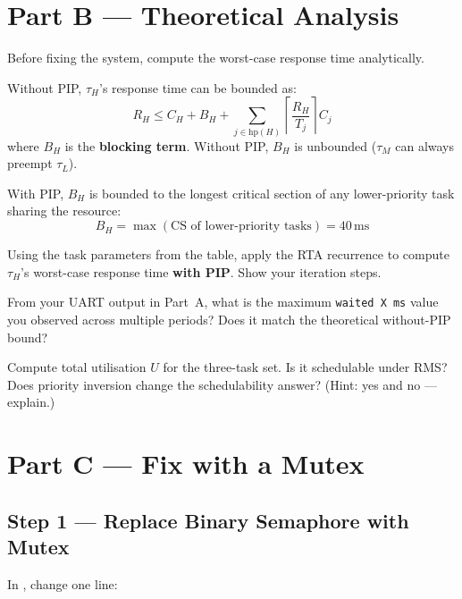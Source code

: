 \documentclass[11pt, a4paper]{article}
\begin{document}
\section{Part B --- Theoretical Analysis}

Before fixing the system, compute the worst-case response time analytically.

Without PIP, $\tau_H$'s response time can be bounded as:
\[
  R_H \leq C_H + B_H + \sum_{j \in \mathrm{hp}(H)} \left\lceil \frac{R_H}{T_j} \right\rceil C_j
\]
where $B_H$ is the \textbf{blocking term}. Without PIP, $B_H$ is unbounded ($\tau_M$ can
always preempt $\tau_L$).

With PIP, $B_H$ is bounded to the longest critical section of any lower-priority task
sharing the resource:
\[
  B_H = \max(\text{CS of lower-priority tasks}) = 40\,\mathrm{ms}
\]

\begin{questionbox}[~B1]
  Using the task parameters from the table, apply the RTA recurrence to compute
  $\tau_H$'s worst-case response time \textbf{with PIP}. Show your iteration steps.
\end{questionbox}

\begin{questionbox}[~B2]
  From your UART output in Part~A, what is the maximum \texttt{waited X ms} value you
  observed across multiple periods? Does it match the theoretical without-PIP bound?
\end{questionbox}

\begin{questionbox}[~B3]
  Compute total utilisation $U$ for the three-task set. Is it schedulable under RMS?
  Does priority inversion change the schedulability answer? (Hint: yes and no ---
  explain.)
\end{questionbox}

\section{Part C --- Fix with a Mutex}

\subsection{Step 1 --- Replace Binary Semaphore with Mutex}

In , change one line:
\end{document}
